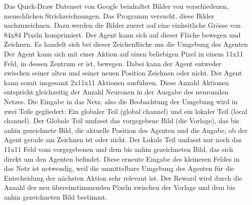 Das Quick-Draw Datenset von Google beinhaltet Bilder von verschiedenen,
menschlichen Strichzeichnungen. Das Programm versucht, diese Bilder
nachzuzeichnen. Dazu werden die Bilder zuerst auf eine einheitliche Grösse von
84x84 Pixeln komprimiert. Der Agent kann sich auf dieser Fläche bewegen und
Zeichnen. Es handelt sich bei dieser Zeichenfläche um die Umgebung des Agenten
Der Agent kann sich mit einer Aktion auf einen beliebigen Pixel in einem 11x11
Feld, in dessen Zentrum er ist, bewegen. Dabei kann der Agent entweder zwischen
seiner alten und seiner neuen Position Zeichnen oder nicht. Der Agent kann somit
insgesamt 2x11x11 Aktionen ausführen. Diese Anzahl Aktionen entspricht
gleichzeitig der Anzahl Neuronen in der Ausgabe des neuronalen Netzes. Die
Eingabe in das Netz, also die Beobachtung der Umgebung wird in zwei Teile
gegliedert: Ein globaler Teil (global channel) und ein lokaler Teil (local
channel). Der Globale Teil umfasst das vorgegebene Bild (die Vorlage), das bis
anhin gezeichnete Bild, die aktuelle Position des Agenten und die Angabe, ob der
Agent gerade am Zeichnen ist oder nicht. Der Lokale Teil umfasst nur noch das
11x11 Feld vom vorgegebenen und dem bis anhin gezeichneten Bild, das sich direkt
um den Agenten befindet. Diese erneute Eingabe des kleineren Feldes in das Netz
ist notwendig, weil die unmittelbare Umgebung des Agenten für die Entscheidung
der nächsten Aktion sehr relevant ist. Der Reward wird durch die Anzahl der neu
übereinstimmenden Pixeln zwischen der Vorlage und dem bis anhin
gezeichneten Bild bestimmt. 














